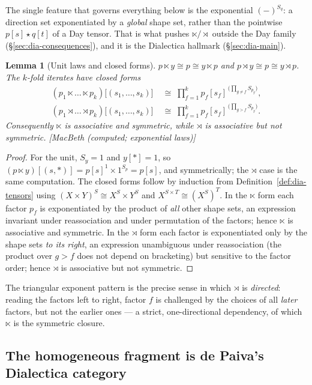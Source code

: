 \documentclass[11pt,a4paper]{article}
\theoremstyle{plain}
\newtheorem{Lemma}[Theorem]{Lemma}
\theoremstyle{definition}
\theoremstyle{remark}
\newcommand{\prov}[1]{\hfill\textsf{\footnotesize[#1]}}
\begin{document}
The single feature that governs everything below is the exponential
$(-)^{S_q}$: a direction set exponentiated by a \emph{global} shape set, rather
than the pointwise $p[s]\star q[t]$ of a Day tensor. That is what pushes
$\ltimes/\rtimes$ outside the Day family (§\ref{sec:dia-consequences}), and it
is the Dialectica hallmark (§\ref{sec:dia-main}).

\begin{Lemma}[Unit laws and closed forms]
\label{lem:nfold}
$p\ltimes y\cong p\cong y\ltimes p$ and $p\rtimes y\cong p\cong y\rtimes p$.
The $k$-fold iterates have closed forms
\begin{align*}
  (p_1\ltimes\dots\ltimes p_k)\bigl[(s_1,\dots,s_k)\bigr]
    &\;\cong\; \prod_{f=1}^{k} p_f[s_f]^{\,\bigl(\prod_{g\neq f}S_{p_g}\bigr)},\\
  (p_1\rtimes\dots\rtimes p_k)\bigl[(s_1,\dots,s_k)\bigr]
    &\;\cong\; \prod_{f=1}^{k} p_f[s_f]^{\,\bigl(\prod_{g> f}S_{p_g}\bigr)} .
\end{align*}
Consequently $\ltimes$ is associative and symmetric, while $\rtimes$ is
associative but not symmetric.
\prov{MacBeth (computed; exponential laws)}
\end{Lemma}

\begin{proof}
For the unit, $S_y=1$ and $y[\ast]=1$, so
$(p\ltimes y)[(s,\ast)]=p[s]^{1}\times 1^{S_p}=p[s]$, and symmetrically; the
$\rtimes$ case is the same computation. The closed forms follow by induction from
Definition~\ref{def:dia-tensors} using $(X\times Y)^{S}\cong X^{S}\times Y^{S}$
and $X^{S\times T}\cong(X^{S})^{T}$. In the $\ltimes$ form each factor $p_f$ is
exponentiated by the product of \emph{all} other shape sets, an expression
invariant under reassociation and under permutation of the factors; hence
$\ltimes$ is associative and symmetric. In the $\rtimes$ form each factor is
exponentiated only by the shape sets \emph{to its right}, an expression
unambiguous under reassociation (the product over $g>f$ does not depend on
bracketing) but sensitive to the factor order; hence $\rtimes$ is associative but
not symmetric.
\end{proof}

The triangular exponent pattern is the precise sense in which $\rtimes$ is
\emph{directed}: reading the factors left to right, factor $f$ is challenged by
the choices of all \emph{later} factors, but not the earlier ones --- a strict,
one-directional dependency, of which $\ltimes$ is the symmetric closure.

\subsection{The homogeneous fragment is de Paiva's Dialectica category}
\label{sec:dia-hmg}
\end{document}
